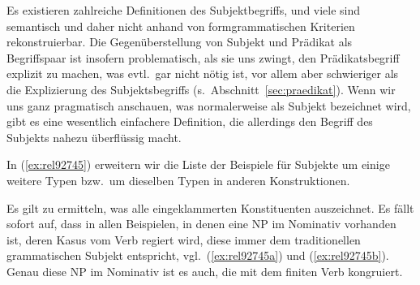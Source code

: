\begin{exe}
  \ex\label{ex:rel23432}
  \begin{xlist}
  \end{xlist}
\end{exe}

\Np

Es existieren zahlreiche Definitionen des Subjektbegriffs, und viele sind semantisch und daher nicht anhand von formgrammatischen Kriterien rekonstruierbar.
Die Gegenüberstellung von Subjekt und Prädikat als Begriffspaar ist insofern problematisch, als sie uns zwingt, den Prädikatsbegriff explizit zu machen, was evtl.\ gar nicht nötig ist, vor allem aber schwieriger als die Explizierung des Subjektsbegriffs (s.\ Abschnitt~\ref{sec:praedikat}).
Wenn wir uns ganz pragmatisch anschauen, was normalerweise als Subjekt bezeichnet wird, gibt es eine wesentlich einfachere Definition, die allerdings den Begriff des Subjekts nahezu überflüssig macht.

In (\ref{ex:rel92745}) erweitern wir die Liste der Beispiele für Subjekte um einige weitere Typen bzw.\ um dieselben Typen in anderen Konstruktionen.

\begin{exe}
  \ex\label{ex:rel92745}
  \begin{xlist}
  \end{xlist}
\end{exe}

Es gilt zu ermitteln, was alle eingeklammerten Konstituenten auszeichnet.
Es fällt sofort auf, dass in allen Beispielen, in denen eine NP im Nominativ vorhanden ist, deren Kasus vom Verb regiert wird, diese immer dem traditionellen grammatischen Subjekt entspricht, vgl.\ (\ref{ex:rel92745a}) und (\ref{ex:rel92745b}).
Genau diese NP im Nominativ ist es auch, die mit dem finiten Verb kongruiert.

